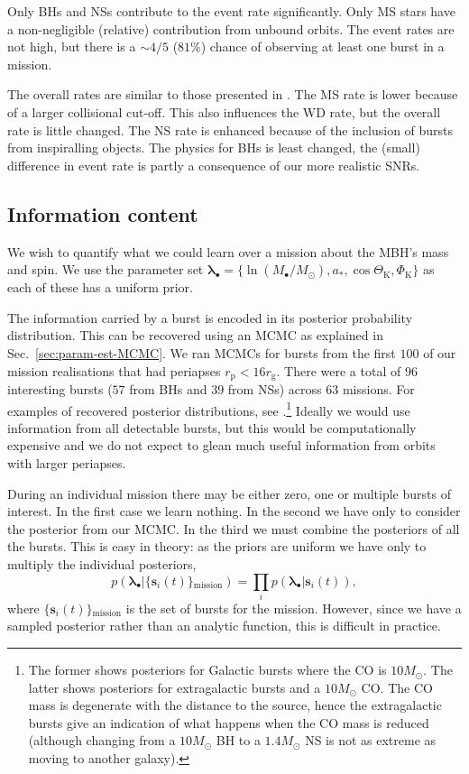 \documentclass[useAMS,usedcolumn,usegraphicx,usenatbib]{mn2e}
\newcommand{\secref}[1]{Sec.~\ref{sec:#1}}
\newcommand{\sub}[1]{\ensuremath{_\mathrm{#1}}}
\begin{document}
Only BHs and NSs contribute to the event rate significantly. Only MS stars have a non-negligible (relative) contribution from unbound orbits. The event rates are not high, but there is a $\sim 4/5$ ($81\%$) chance of observing at least one burst in a mission.

The overall rates are similar to those presented in \citet{Hopman2007}. The MS rate is lower because of a larger collisional cut-off. This also influences the WD rate, but the overall rate is little changed. The NS rate is enhanced because of the inclusion of bursts from inspiralling objects. The physics for BHs is least changed, the (small) difference in event rate is partly a consequence of our more realistic SNRs.

\subsection{Information content}

We wish to quantify what we could learn over a mission about the MBH's mass and spin. We use the parameter set $\boldsymbol{\lambda}_\bullet = \{\ln (M_\bullet/M_\odot), a_\ast, \cos \Theta\sub{K}, \Phi\sub{K}\}$ as each of these has a uniform prior.

The information carried by a burst is encoded in its posterior probability distribution. This can be recovered using an MCMC as explained in \secref{param-est-MCMC}. We ran MCMCs for bursts from the first $100$ of our mission realisations that had periapses $r\sub{p} < 16 r\sub{g}$. There were a total of $96$ interesting bursts ($57$ from BHs and $39$ from NSs) across $63$ missions. For examples of recovered posterior distributions, see \citet{Berry2013,Berry2013a}.\footnote{The former shows posteriors for Galactic bursts where the CO is $10 M_\odot$. The latter shows posteriors for extragalactic bursts and a $10 M_\odot$ CO. The CO mass is degenerate with the distance to the source, hence the extragalactic bursts give an indication of what happens when the CO mass is reduced (although changing from a $10 M_\odot$ BH to a $1.4 M_\odot$ NS is not as extreme as moving to another galaxy).} Ideally we would use information from all detectable bursts, but this would be computationally expensive and we do not expect to glean much useful information from orbits with larger periapses.

During an individual mission there may be either zero, one or multiple bursts of interest. In the first case we learn nothing. In the second we have only to consider the posterior from our MCMC. In the third we must combine the posteriors of all the bursts. This is easy in theory: as the priors are uniform we have only to multiply the individual posteriors,
\begin{equation}
p(\boldsymbol{\lambda}_\bullet|\{\boldsymbol{s}_i(t)\}\sub{mission}) = \prod_i p(\boldsymbol{\lambda}_\bullet|\boldsymbol{s}_i(t)),
\end{equation}
where $\{\boldsymbol{s}_i(t)\}\sub{mission}$ is the set of bursts for the mission. However, since we have a sampled posterior rather than an analytic function, this is difficult in practice.
\end{document}
